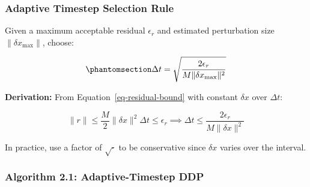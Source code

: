 \documentclass[
  letterpaper,
  DIV=11,
  numbers=noendperiod]{scrartcl}
\begin{document}
\subsubsection{Adaptive Timestep Selection
Rule}\label{adaptive-timestep-selection-rule}

Given a maximum acceptable residual \(\epsilon_r\) and estimated
perturbation size \(\|\delta x_{\max}\|\), choose:

\begin{equation}\phantomsection\label{eq-adaptive-timestep}{
\Delta t = \sqrt{\frac{2 \epsilon_r}{M \|\delta x_{\max}\|^2}}
}\end{equation}

\textbf{Derivation:} From Equation~\ref{eq-residual-bound} with constant
\(\delta x\) over \(\Delta t\):

\[
\|r\| \leq \frac{M}{2} \|\delta x\|^2 \Delta t \leq \epsilon_r \implies \Delta t \leq \frac{2\epsilon_r}{M \|\delta x\|^2}
\]

In practice, use a factor of \(\sqrt{\cdot}\) to be conservative since
\(\delta x\) varies over the interval.

\subsubsection{Algorithm 2.1: Adaptive-Timestep
DDP}\label{algorithm-2.1-adaptive-timestep-ddp}
\end{document}
